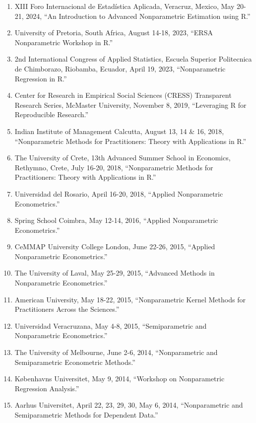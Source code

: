 \documentclass[
]{article}
\begin{document}
\begin{enumerate}
\def\labelenumi{\arabic{enumi}.}
\item
  XIII Foro Internacional de Estadística Aplicada, Veracruz, Mexico, May
  20-21, 2024, ``An Introduction to Advanced Nonparametric Estimation
  using R.''
\item
  University of Pretoria, South Africa, August 14-18, 2023, ``ERSA
  Nonparametric Workshop in R.''
\item
  2nd International Congress of Applied Statistics, Escuela Superior
  Politecnica de Chimborazo, Riobamba, Ecuador, April 19, 2023,
  ``Nonparametric Regression in R.''
\item
  Center for Research in Empirical Social Sciences (CRESS) Transparent
  Research Series, McMaster University, November 8, 2019, ``Leveraging R
  for Reproducible Research.''
\item
  Indian Institute of Management Calcutta, August 13, 14 \& 16, 2018,
  ``Nonparametric Methods for Practitioners: Theory with Applications in
  R.''
\item
  The University of Crete, 13th Advanced Summer School in Economics,
  Rethymno, Crete, July 16-20, 2018, ``Nonparametric Methods for
  Practitioners: Theory with Applications in R.''
\item
  Universidad del Rosario, April 16-20, 2018, ``Applied Nonparametric
  Econometrics.''
\item
  Spring School Coimbra, May 12-14, 2016, ``Applied Nonparametric
  Econometrics.''
\item
  CeMMAP University College London, June 22-26, 2015, ``Applied
  Nonparametric Econometrics.''
\item
  The University of Laval, May 25-29, 2015, ``Advanced Methods in
  Nonparametric Econometrics.''
\item
  American University, May 18-22, 2015, ``Nonparametric Kernel Methods
  for Practitioners Across the Sciences.''
\item
  Universidad Veracruzana, May 4-8, 2015, ``Semiparametric and
  Nonparametric Econometrics.''
\item
  The University of Melbourne, June 2-6, 2014, ``Nonparametric and
  Semiparametric Econometric Methods.''
\item
  Københavns Universitet, May 9, 2014, ``Workshop on Nonparametric
  Regression Analysis.''
\item
  Aarhus Universitet, April 22, 23, 29, 30, May 6, 2014, ``Nonparametric
  and Semiparametric Methods for Dependent Data.''

\end{enumerate}
\end{document}
